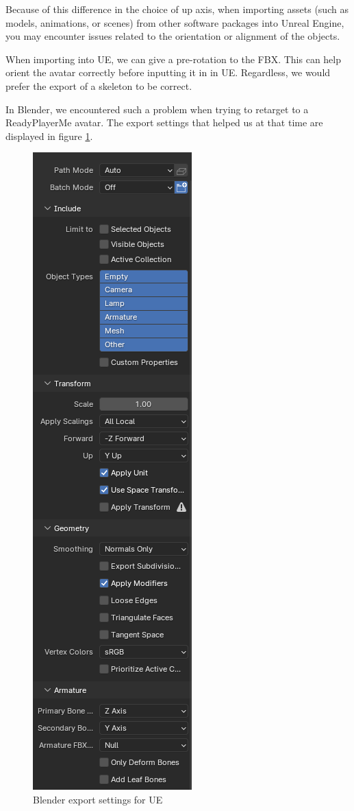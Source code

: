 \documentclass{uva-inf-article}
\begin{document}
Because of this difference in the choice of up axis, when importing assets (such as models, animations, or scenes) from other software packages into Unreal Engine, you may encounter issues related to the orientation or alignment of the objects.

When importing into UE, we can give a pre-rotation to the FBX. This can help orient the avatar correctly before inputting it in in UE.
Regardless, we would prefer the export of a skeleton to be correct.

In Blender, we encountered such a problem when trying to retarget to a ReadyPlayerMe avatar. The export settings that helped us at that time are displayed in figure
\ref{fig:blenderSettings}.
\begin{figure}
    \centering
    \includegraphics[height=0.9\textheight]{imgs/settings.png}
    \caption{Blender export settings for UE}
    \label{fig:blenderSettings}
\end{figure}
\end{document}
